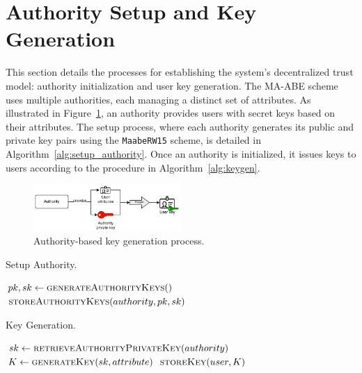 \documentclass[cic,tc,english]{iiufrgs}
\numberwithin{algorithm}{chapter}
\begin{document}
    \section{Authority Setup and Key Generation}
        \label{sec:auth_setup}

        This section details the processes for establishing the system's decentralized trust model: authority initialization and user key generation. The MA-ABE scheme uses multiple authorities, each managing a distinct set of attributes. As illustrated in Figure~\ref{fig:keygen_diagram}, an authority provides users with secret keys based on their attributes. The setup process, where each authority generates its public and private key pairs using the \texttt{MaabeRW15} scheme, is detailed in Algorithm~\ref{alg:setup_authority}. Once an authority is initialized, it issues keys to users according to the procedure in Algorithm~\ref{alg:keygen}.

        \begin{figure}[h]
            \centering
            \includegraphics[width=0.5\textwidth]{images/diagrams/keygen_diagram.pdf}
            \caption{Authority-based key generation process.}
            \label{fig:keygen_diagram}
        \end{figure}

        \begin{algorithm}[h]
            \caption{Setup Authority.}
            \label{alg:setup_authority}
            \begin{algorithmic}[1]
                \State $pk, sk \gets \textsc{generateAuthorityKeys}()$
                \State $\textsc{storeAuthorityKeys}(authority, pk, sk)$
            \EndProcedure
            \end{algorithmic}
        \end{algorithm}

        \begin{algorithm}[h]
            \caption{Key Generation.}
            \label{alg:keygen}
            \begin{algorithmic}[1]
                \State $sk \gets \textsc{retrieveAuthorityPrivateKey}(authority)$
                \State $K \gets \textsc{generateKey}(sk, attribute)$
                \State $\textsc{storeKey}(user, K)$
            \EndProcedure
            \end{algorithmic}
        \end{algorithm}
\end{document}
